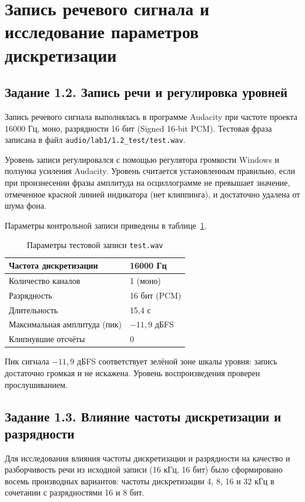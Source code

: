 \section{Запись речевого сигнала и исследование параметров дискретизации}
\label{sec:recording}

\subsection{Задание 1.2. Запись речи и регулировка уровней}

Запись речевого сигнала выполнялась в программе Audacity при частоте
проекта 16000 Гц, моно, разрядности 16 бит (Signed 16-bit PCM).
Тестовая фраза записана в файл \texttt{audio/lab1/1.2\_test/test.wav}.

Уровень записи регулировался с помощью регулятора громкости Windows и
ползунка усиления Audacity. Уровень считается установленным правильно,
если при произнесении фразы амплитуда на осциллограмме не превышает
значение, отмеченное красной линией индикатора (нет клиппинга), и
достаточно удалена от шума фона.

Параметры контрольной записи приведены в таблице~\ref{tab:test}.

\begin{table}[H]
	\centering
	\caption{Параметры тестовой записи \texttt{test.wav}}
	\label{tab:test}
	\begin{tabular}{|l|l|}
		\hline
		Частота дискретизации & 16000 Гц \\
		\hline
		Количество каналов & 1 (моно) \\
		\hline
		Разрядность & 16 бит (PCM) \\
		\hline
		Длительность & 15,4 с \\
		\hline
		Максимальная амплитуда (пик) & $-11{,}9$ дБFS \\
		\hline
		Клипнувшие отсчёты & 0 \\
		\hline
	\end{tabular}
\end{table}

Пик сигнала $-11{,}9$ дБFS соответствует зелёной зоне шкалы уровня:
запись достаточно громкая и не искажена. Уровень воспроизведения
проверен прослушиванием.

\subsection{Задание 1.3. Влияние частоты дискретизации и разрядности}

Для исследования влияния частоты дискретизации и разрядности на качество
и разборчивость речи из исходной записи (16 кГц, 16 бит) было
сформировано восемь производных вариантов: частоты дискретизации 4, 8, 16
и 32 кГц в сочетании с разрядностями 16 и 8 бит.

